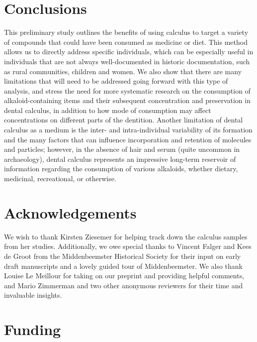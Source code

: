 \documentclass[
  11pt,
  leqno]{scrartcl}
\begin{document}
\section{Conclusions}\label{conclusions}

This preliminary study outlines the benefits of using calculus to target
a variety of compounds that could have been consumed as medicine or
diet. This method allows us to directly address specific individuals,
which can be especially useful in individuals that are not always
well-documented in historic documentation, such as rural communities,
children and women. We also show that there are many limitations that
will need to be addressed going forward with this type of analysis, and
stress the need for more systematic research on the consumption of
alkaloid-containing items and their subsequent concentration and
preservation in dental calculus, in addition to how mode of consumption
may affect concentrations on different parts of the dentition. Another
limitation of dental calculus as a medium is the inter- and
intra-individual variability of its formation and the many factors that
can influence incorporation and retention of molecules and particles;
however, in the absence of hair and serum (quite uncommon in
archaeology), dental calculus represents an impressive long-term
reservoir of information regarding the consumption of various alkaloids,
whether dietary, medicinal, recreational, or otherwise.

\section*{Acknowledgements}\label{acknowledgements}

We wish to thank Kirsten Ziesemer for helping track down the calculus
samples from her studies. Additionally, we owe special thanks to Vincent
Falger and Kees de Groot from the Middenbeemster Historical Society for
their input on early draft manuscripts and a lovely guided tour of
Middenbeemster. We also thank Louise Le Meillour for taking on our
preprint and providing helpful comments, and Mario Zimmerman and two
other anonymous reviewers for their time and invaluable insights.

\section*{Funding}\label{funding}
\end{document}
